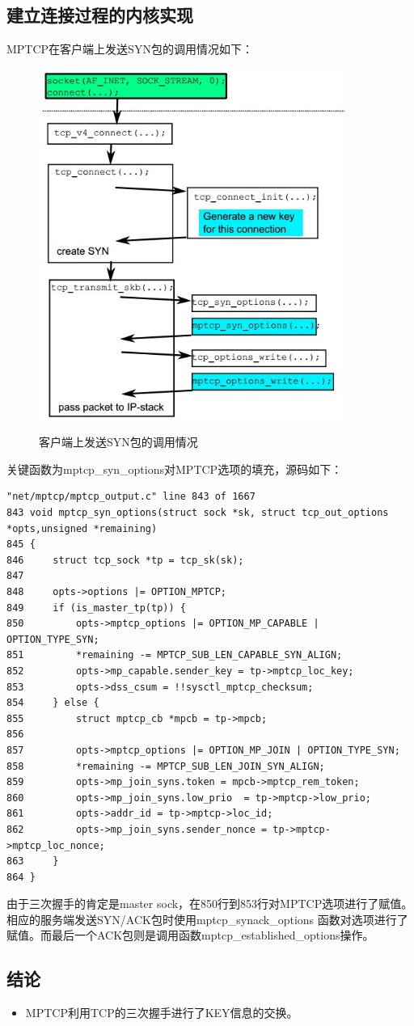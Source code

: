\subsection{建立连接过程的内核实现}
MPTCP在客户端上发送SYN包的调用情况如下：
\begin{figure}[H]
  \centering
  \includegraphics[width=10cm]{dias/Invoke_SYN_in_Cilent.jpg}\\
  \caption{客户端上发送SYN包的调用情况}
\end{figure}
关键函数为mptcp\_syn\_options对MPTCP选项的填充，源码如下：
\small\begin{verbatim}
"net/mptcp/mptcp_output.c" line 843 of 1667
843 void mptcp_syn_options(struct sock *sk, struct tcp_out_options *opts,unsigned *remaining)
845 {
846     struct tcp_sock *tp = tcp_sk(sk);
847
848     opts->options |= OPTION_MPTCP;
849     if (is_master_tp(tp)) {
850         opts->mptcp_options |= OPTION_MP_CAPABLE | OPTION_TYPE_SYN;
851         *remaining -= MPTCP_SUB_LEN_CAPABLE_SYN_ALIGN;
852         opts->mp_capable.sender_key = tp->mptcp_loc_key;
853         opts->dss_csum = !!sysctl_mptcp_checksum;
854     } else {
855         struct mptcp_cb *mpcb = tp->mpcb;
856
857         opts->mptcp_options |= OPTION_MP_JOIN | OPTION_TYPE_SYN;
858         *remaining -= MPTCP_SUB_LEN_JOIN_SYN_ALIGN;
859         opts->mp_join_syns.token = mpcb->mptcp_rem_token;
860         opts->mp_join_syns.low_prio  = tp->mptcp->low_prio;
861         opts->addr_id = tp->mptcp->loc_id;
862         opts->mp_join_syns.sender_nonce = tp->mptcp->mptcp_loc_nonce;
863     }
864 }
\end{verbatim}\normalsize
由于三次握手的肯定是master sock，在850行到853行对MPTCP选项进行了赋值。相应的服务端发送SYN/ACK包时使用mptcp\_synack\_options 函数对选项进行了赋值。而最后一个ACK包则是调用函数mptcp\_established\_options操作。
\subsection{结论}
\begin{itemize}
  \item MPTCP利用TCP的三次握手进行了KEY信息的交换。
\end{itemize}